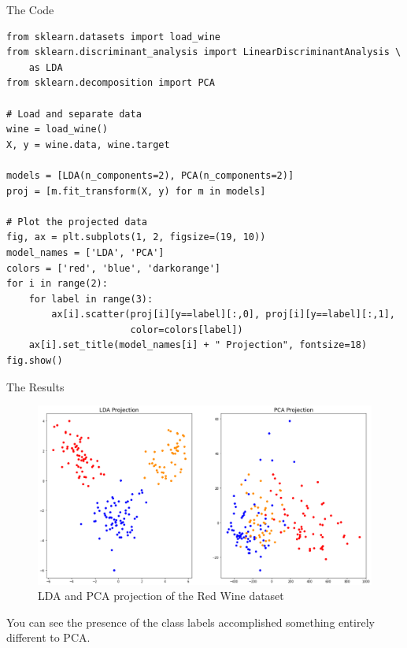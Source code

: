 \documentclass[9pt]{beamer}
\begin{document}
\begin{frame}[fragile]{The Code}
    \begin{Verbatim}[fontsize=\small]
from sklearn.datasets import load_wine
from sklearn.discriminant_analysis import LinearDiscriminantAnalysis \
    as LDA
from sklearn.decomposition import PCA

# Load and separate data
wine = load_wine()
X, y = wine.data, wine.target

models = [LDA(n_components=2), PCA(n_components=2)]
proj = [m.fit_transform(X, y) for m in models]

# Plot the projected data
fig, ax = plt.subplots(1, 2, figsize=(19, 10))
model_names = ['LDA', 'PCA']
colors = ['red', 'blue', 'darkorange']
for i in range(2):
    for label in range(3):
        ax[i].scatter(proj[i][y==label][:,0], proj[i][y==label][:,1], 
                      color=colors[label])
    ax[i].set_title(model_names[i] + " Projection", fontsize=18)
fig.show()
    \end{Verbatim}
\end{frame}
\begin{frame}{The Results}
    \begin{figure}
        \centering
        \includegraphics[height=0.55\paperheight, width=\textwidth]{pca_lda.png}
        \caption{LDA and PCA projection of the Red Wine dataset}
        \label{fig:LDAvsPCA}
    \end{figure}
    You can see the presence of the class labels accomplished something entirely different to PCA. 
\end{frame}
\end{document}

